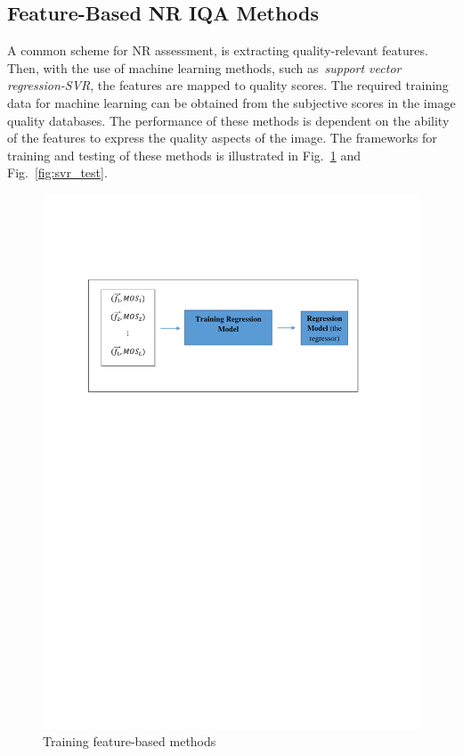 \subsection{Feature-Based NR IQA Methods}
A common scheme for NR assessment, is extracting quality-relevant features. Then, with the use of machine learning methods, such as~\emph{support vector regression-SVR}, the features are mapped to quality scores. The required training data for machine learning can be obtained from the subjective scores in the image quality databases. The performance of these methods is dependent on the ability of the features to express the quality aspects of the image. The frameworks for training and testing of these methods is illustrated in Fig.~\ref{fig:svr_train} and Fig.~\ref{fig:svr_test}.
\begin{figure}
    \centering
    \includegraphics[width=\textwidth, trim={2.5cm 18.7cm 3.4cm 4.7cm}, clip]{./figs/fg_svr_train}
    \caption{Training feature-based methods}
    \label{fig:svr_train}
\end{figure}

